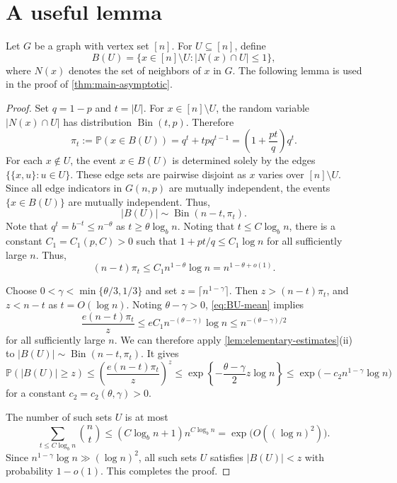 \documentclass[11pt,reqno]{amsart}
\newtheorem{lemma}[theorem]{Lemma}
\theoremstyle{definition}
\theoremstyle{remark}
\newcommand{\PP}{\mathbb P}
\begin{document}
\section{A useful lemma}

Let $G$ be a graph with vertex set $[n]$. For $U\subseteq[n]$, define
\[
 B(U)=\{x\in[n]\setminus U:|N(x)\cap U|\le1\},
\]
where $N(x)$ denotes the set of neighbors of $x$ in $G$.
The following lemma is used in the proof of \cref{thm:main-asymptotic}.


\begin{proof}
Set $q=1-p$ and  $t=|U|$.  For
$x\in[n]\setminus U$, the random variable $|N(x)\cap U|$ has distribution
$\operatorname{Bin}(t,p)$.  Therefore
\[
 \pi_t:=\PP(x\in B(U))
 =q^t+tpq^{t-1}
 =\left(1+\frac{pt}{q}\right)q^t.
\]
For each $x\notin U$, the event $x\in B(U)$ is determined solely by the
edges $\{\{x,u\}:u\in U\}$. These edge sets are pairwise disjoint as $x$
varies over $[n]\setminus U$. Since all edge indicators in $G(n,p)$ are
mutually independent, the events $\{x\in B(U)\}$ are mutually independent.
Thus,
\[
 |B(U)|\sim\operatorname{Bin}(n-t,\pi_t).
\]
 Note that
$q^t=b^{-t}\le n^{-\theta}$ as $t\ge\theta\log_b n$.  Noting that $t\le C\log_b n$, there is a
constant $C_1=C_1(p,C)>0$ such that
$1+pt/q\le C_1\log n$ for all sufficiently large $n$.  
Thus,
\begin{equation}\label{eq:BU-mean}
 (n-t)\pi_t\le C_1n^{1-\theta}\log n
 =n^{1-\theta+o(1)}.
\end{equation}

Choose $0<\gamma<\min\{\theta/3,1/3\}$ and set
$z=\lceil n^{1-\gamma}\rceil$.  Then $z>(n-t)\pi_t$, and 
$z<n-t$ as $t=O(\log n)$. 
Noting $\theta-\gamma>0$,
\eqref{eq:BU-mean} implies
\[
 \frac{e(n-t)\pi_t}{z}
 \le eC_1n^{-(\theta-\gamma)}\log n
 \le n^{-(\theta-\gamma)/2}
\]
for all sufficiently large $n$.    We can therefore apply
\cref{lem:elementary-estimates}(ii) to
$|B(U)|\sim\operatorname{Bin}(n-t,\pi_t)$.  It gives
\[
 \PP(|B(U)|\ge z)
 \le\left(\frac{e(n-t)\pi_t}{z}\right)^z
\le \exp\left\{-\frac{\theta-\gamma}{2}z\log n\right\}
 \le \exp\bigl(-c_2n^{1-\gamma}\log n\bigr)
\]
for a constant $c_2=c_2(\theta,\gamma)>0$.

The number of such sets $U$ is at most
\[
 \sum_{t\le C\log_b n}\binom nt
 \le(C\log_b n+1)n^{C\log_b n}
 =\exp\bigl(O((\log n)^2)\bigr).
\]
Since $n^{1-\gamma}\log n\gg(\log n)^2$, all such sets $U$ satisfies $|B(U)|<z$ with probability $1-o(1)$.
This completes the proof.
\end{proof}
\end{document}
